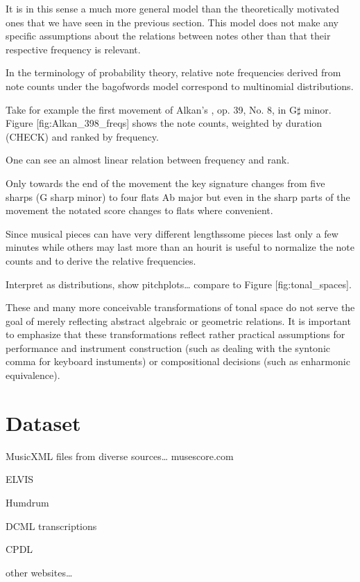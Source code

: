 \documentclass[letterpaper,10pt,english]{sphinxmanual}
\begin{document}
\sphinxAtStartPar
It is in this sense a much more general model than the theoretically
motivated ones that we have seen in the previous section. This model
does not make any specific assumptions about the relations between notes
other than that their respective frequency is relevant.

\sphinxAtStartPar
In the terminology of probability theory, relative note frequencies
derived from note counts under the bag\sphinxhyphen{}of\sphinxhyphen{}words model correspond to
multinomial distributions.

\sphinxAtStartPar
Take for example the first movement of Alkan’s , op. 39, No. 8, in G\(\sharp\) minor. Figure
{[}fig:Alkan\_39\sphinxhyphen{}8\_freqs{]} shows the note counts, weighted by duration
(CHECK) and ranked by frequency.

\sphinxAtStartPar
One can see an almost linear relation between frequency and rank.

\sphinxAtStartPar
Only towards the end of the movement the key signature changes from five
sharps (G sharp minor) to four flats Ab major but even in the sharp
parts of the movement the notated score changes to flats where
convenient.

\sphinxAtStartPar
Since musical pieces can have very different lengths\textendash{}some pieces last
only a few minutes while others may last more than an hour\textendash{}it is useful
to normalize the note counts and to derive the relative frequencies.

\sphinxAtStartPar
Interpret as distributions, show pitchplots… compare to Figure
{[}fig:tonal\_spaces{]}.

\sphinxAtStartPar
These and many more conceivable transformations of tonal space do not
serve the goal of merely reflecting abstract algebraic or geometric
relations. It is important to emphasize that these transformations
reflect rather practical assumptions for performance and instrument
construction (such as dealing with the syntonic comma for keyboard
instuments) or compositional decisions (such as enharmonic equivalence).


\section{Dataset}
\label{\detokenize{5_notes:dataset}}
\begin{DUlineblock}{0em}
\item[] MusicXML files from diverse sources… \sphinxhyphen{} musescore.com
\item[] \sphinxhyphen{} ELVIS
\item[] \sphinxhyphen{} Humdrum
\item[] \sphinxhyphen{} DCML transcriptions
\item[] \sphinxhyphen{} CPDL
\item[] \sphinxhyphen{} other websites…
\end{DUlineblock}
\end{document}
